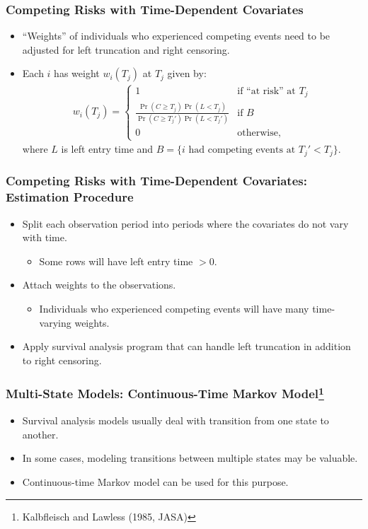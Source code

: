 \documentclass[aspectratio=169, 12pt]{beamer}
\begin{document}
	\begin{frame}
	\frametitle{Competing Risks with Time-Dependent Covariates}
	\begin{itemize}
	\item ``Weights'' of individuals who experienced competing events need to be adjusted for left truncation and right censoring.
	\item Each $i$ has weight $w_i(T_j)$ at $T_j$ given by:
	\begin{eqnarray*}
	w_i(T_j) =
	\begin{cases}
	1 & \text{if ``at risk'' at $T_j$}\\
	\frac{\Pr(C \geq T_j) \Pr(L < T_j)}{\Pr(C \geq T_j') \Pr(L < T_j')} & \text{if $B$}\\
	0 & \text{otherwise},
	\end{cases}
	\end{eqnarray*}
	where $L$ is left entry time and $B = \{i \text{ had competing events at } T_j' < T_j\}$.

	\end{itemize}

	\end{frame}

	\begin{frame}
	\frametitle{Competing Risks with Time-Dependent Covariates: Estimation Procedure}
	\begin{itemize}
	\item Split each observation period into periods where the covariates do not vary with time.
	\begin{itemize}
	\item Some rows will have left entry time $> 0$.
	\end{itemize}
	\item Attach weights to the observations.
	\begin{itemize}
	\item Individuals who experienced competing events will have many time-varying weights.
	\end{itemize}
	\item Apply survival analysis program that can handle left truncation in addition to right censoring.

	\end{itemize}

	\end{frame}

	\begin{frame}
	\frametitle{Multi-State Models: Continuous-Time Markov Model\footnote{Kalbfleisch and Lawless (1985, JASA)}}
	\begin{itemize}
	\item Survival analysis models usually deal with transition from one state to another.
	\item In some cases, modeling transitions between multiple states may be valuable.
	\item Continuous-time Markov model can be used for this purpose.
	\end{itemize}
	\end{frame}
\end{document}
